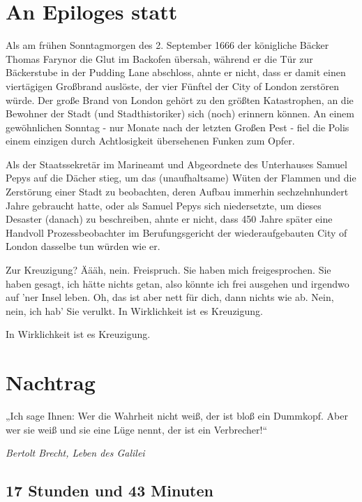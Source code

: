 \begin{multicols}{2}

\chapter{An Epiloges statt} %
Als am frühen Sonntagmorgen des 2. September 1666
der königliche Bäcker Thomas Farynor die Glut im Backofen übersah, während er die Tür zur Bäckerstube in der
Pudding Lane abschloss, ahnte er nicht, dass er damit
einen viertägigen Großbrand auslöste, der vier Fünftel
der City of London zerstören würde. Der große Brand
von London gehört zu den größten Katastrophen, an die
Bewohner der Stadt (und Stadthistoriker) sich (noch) erinnern können. An einem gewöhnlichen Sonntag - nur
Monate nach der letzten Großen Pest - fiel die Polis einem einzigen durch Achtlosigkeit übersehenen Funken
zum Opfer.

Als der Staatssekretär im Marineamt und Abgeordnete
des Unterhauses Samuel Pepys auf die Dächer stieg, um
das (unaufhaltsame) Wüten der Flammen und die Zerstörung einer Stadt zu beobachten, deren Aufbau immerhin sechzehnhundert Jahre gebraucht hatte, oder
als Samuel Pepys sich niedersetzte, um dieses Desaster
(danach) zu beschreiben, ahnte er nicht, dass 450 Jahre
später eine Handvoll Prozessbeobachter im Berufungsgericht der wiederaufgebauten City of London dasselbe
tun würden wie er.

Zur Kreuzigung? Äääh, nein. Freispruch. Sie haben mich
freigesprochen. Sie haben gesagt, ich hätte nichts getan,
also könnte ich frei ausgehen und irgendwo auf ’ner Insel leben. Oh, das ist aber nett für dich, dann nichts wie
ab. Nein, nein, ich hab’ Sie verulkt. In Wirklichkeit ist es
Kreuzigung.

In Wirklichkeit ist es Kreuzigung.



\chapter{Nachtrag}

\epigraph{„Ich sage Ihnen: Wer die Wahrheit nicht weiß, der ist bloß ein Dummkopf. Aber wer sie weiß und sie eine Lüge nennt, der ist ein Verbrecher!“}{\textit{Bertolt Brecht, Leben des Galilei}}


\section{17 Stunden und 43 Minuten}


\end{multicols}
